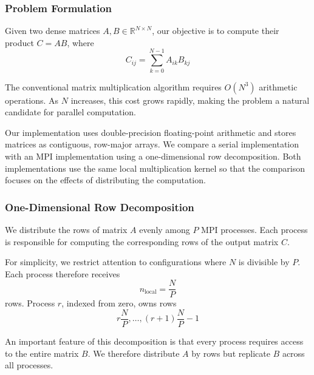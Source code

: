\subsubsection{Problem Formulation}

Given two dense matrices $A,B\in\mathbb{R}^{N\times N}$, our objective is to compute their product $C=AB$, where
\begin{equation}
	C_{ij}=\sum_{k=0}^{N-1}A_{ik}B_{kj}
\end{equation}

The conventional matrix multiplication algorithm requires $O(N^3)$ arithmetic operations. As $N$ increases, this cost grows rapidly, making the problem a natural candidate for parallel computation.

Our implementation uses double-precision floating-point arithmetic and stores matrices as contiguous, row-major arrays. We compare a serial implementation with an MPI implementation using a one-dimensional row decomposition. Both implementations use the same local multiplication kernel so that the comparison focuses on the effects of distributing the computation.

\subsubsection{One-Dimensional Row Decomposition}

We distribute the rows of matrix $A$ evenly among $P$ MPI processes. Each process is responsible for computing the corresponding rows of the output matrix $C$.

For simplicity, we restrict attention to configurations where $N$ is divisible by $P$. Each process therefore receives
\begin{equation}
	n_{\mathrm{local}}=\frac{N}{P}
\end{equation}
rows. Process $r$, indexed from zero, owns rows
\begin{equation}
	r\frac{N}{P},\ldots,(r+1)\frac{N}{P}-1
\end{equation}

An important feature of this decomposition is that every process requires access to the entire matrix $B$. We therefore distribute $A$ by rows but replicate $B$ across all processes.

